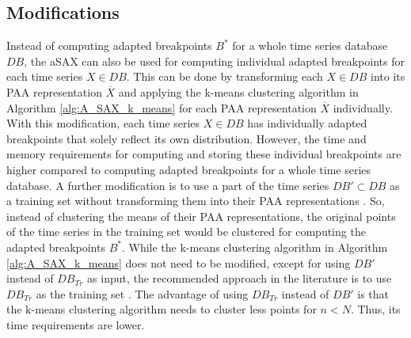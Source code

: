 \subsection*{Modifications} \label{a_sax_modfications}
Instead of computing adapted breakpoints $B^*$ for a whole time series database $DB$, the \ac{aSAX} can also be used for computing individual adapted breakpoints for each time series $X \in DB$. This can be done by transforming each $X \in DB$ into its \ac{PAA} representation $\overline{X}$ and applying the k-means clustering algorithm in Algorithm \ref{alg:A_SAX_k_means} for each \ac{PAA} representation $\overline{X}$ individually. With this modification, each time series $X \in DB$ has individually adapted breakpoints that solely reflect its own distribution. However, the time and memory requirements for computing and storing these individual breakpoints are higher compared to computing adapted breakpoints for a whole time series database. \newline
A further modification is to use a part of the time series $DB' \subset DB$ as a training set without transforming them into their \ac{PAA} representations \cite{A_SAX}. So, instead of clustering the means of their \ac{PAA} representations, the original points of the time series in the training set would be clustered for computing the adapted breakpoints $B^*$. While the k-means clustering algorithm in Algorithm \ref{alg:A_SAX_k_means} does not need to be modified, except for using $DB'$ instead of $DB_{Tr}$ as input, the recommended approach in the literature is to use $DB_{Tr}$ as the training set \cite{A_SAX}. The advantage of using $DB_{Tr}$ instead of $DB'$ is that the k-means clustering algorithm needs to cluster less points for $n < N$. Thus, its time requirements are lower.
